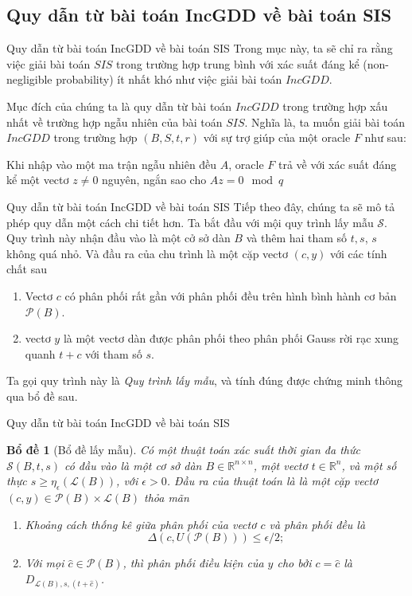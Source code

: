 \documentclass[notheorems,envcountsect,serif,12pt]{beamer}
\newcommand{\R}{\mathbb{R}}
\numberwithin{equation}{section}
\newtheorem{lemma}[theorem]{Bổ đề}
\theoremstyle{definition}
\numberwithin{equation}{section}
\begin{document}
\subsection{Quy dẫn từ bài toán IncGDD về bài toán SIS}
\begin{frame}{Quy dẫn từ bài toán IncGDD về bài toán SIS}
	Trong mục này, ta sẽ chỉ ra rằng việc giải bài toán $SIS$ trong trường hợp trung bình với xác suất đáng kể (non-negligible probability) ít nhất khó như việc giải bài toán $IncGDD$.\pause
	
	Mục đích của chúng ta là quy dẫn từ bài toán $IncGDD$ trong trường hợp xấu nhất về trường hợp ngẫu nhiên của bài toán $SIS$. Nghĩa là, ta muốn giải bài toán $IncGDD$ trong trường hợp $(B, S, t, r)$ với sự trợ giúp của một oracle $F$ như sau:
	\begin{block}{\quad}
		Khi nhập vào một ma trận ngẫu nhiên đều $A$, oracle $F$ trả về với xác suất đáng kể một vectơ $z\ne 0$ nguyên, ngắn sao cho $Az=0\mod q$
	\end{block}\pause
\end{frame}
\begin{frame}{Quy dẫn từ bài toán IncGDD về bài toán SIS}
		Tiếp theo đây, chúng ta sẽ mô tả phép quy dẫn một cách chi tiết hơn. Ta bắt đầu với mội quy trình lấy mẫu $\mathcal{S}$. Quy trình này nhận đầu vào là một cở sở dàn $B$ và thêm hai tham số $t, s$, $s$ không quá nhỏ. Và đầu ra của chu trình là một cặp vectơ $(c, y)$ với các tính chất sau
	\begin{block}{\quad}
		\begin{enumerate}
			\item Vectơ $c$ có phân phối rất gần với phân phối đều trên hình bình hành cơ bản $\mathcal{P}(B)$.
			\item vectơ $y$ là một vectơ dàn được phân phối theo phân phối Gauss rời rạc xung quanh $t+c$ với tham số $s$.
		\end{enumerate}
	\end{block}
	Ta gọi quy trình này là \textit{Quy trình lấy mẫu}, và tính đúng được chứng minh thông qua bổ đề sau.
\end{frame}
\begin{frame}{Quy dẫn từ bài toán IncGDD về bài toán SIS}
	\begin{lemma}[Bổ đề lấy mẫu]\label{BDLM}
		Có một thuật toán xác suất thời gian đa thức $\mathcal{S}(B, t, s)$ có đầu vào là một cơ sở dàn $B\in \R^{n\times n}$, một vectơ $t\in \R^n$, và một số thực $s\ge \eta_\epsilon\left(\mathcal{L}(B)\right)$, với $\epsilon>0$. Đầu ra của thuật toán là là một cặp vectơ $(c, y)\in \mathcal{P}(B)\times \mathcal{L}(B)$ thỏa mãn
		\begin{enumerate}
			\item Khoảng cách thống kê giữa phân phối của vectơ $c$ và phân phối đều là $$\Delta\left(c, U\left(\mathcal{P}(B)\right)\right)\le \epsilon/2;$$
			\item Với mọi $\widehat{c}\in \mathcal{P}(B)$, thì phân phối điều kiện của $y$ cho bởi $c=\widehat{c}$ là $D_{\mathcal{L}(B),s,(t+\widehat{c})}$.
		\end{enumerate}
	\end{lemma}
\end{frame}
\end{document}
